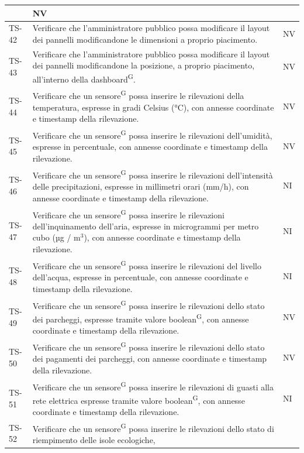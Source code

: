 \documentclass[8pt]{article}
\newcommand{\glossterm}[1]{#1\textsuperscript{G}} %
\begin{document}
\begin{longtable}{|>{\centering}p{2cm}|>{\RaggedRight}m{12cm}|>{\centering\arraybackslash}p{2cm}|}
    & NV\\
    \hline
    TS-42 & Verificare che l'amministratore pubblico possa modificare il layout dei pannelli modificandone le dimensioni a proprio piacimento.
    & NV\\
    \hline
    TS-43 & Verificare che l'amministratore pubblico possa modificare il layout dei pannelli modificandone la posizione, a proprio piacimento, all'interno della \glossterm{dashboard}.
    & NV\\
    \hline
    TS-44 & Verificare che un \glossterm{sensore} possa inserire le rilevazioni della temperatura, espresse in
    gradi Celsius (°C), con annesse coordinate e timestamp della rilevazione. & NV \\
    \hline
    TS-45 & Verificare che un \glossterm{sensore} possa inserire le rilevazioni dell'umidità, espresse in
    percentuale, con annesse coordinate e timestamp della rilevazione. & NV \\
    \hline
    TS-46 & Verificare che un \glossterm{sensore} possa inserire le rilevazioni dell'intensità delle precipitazioni, espresse in
    millimetri orari (mm/h), con annesse coordinate e timestamp della rilevazione. & NI \\
    \hline
    TS-47 & Verificare che un \glossterm{sensore} possa inserire le rilevazioni dell'inquinamento dell'aria, espresse in
    microgrammi per metro cubo (µg / $\mbox{m}^{\mbox{3}}$), con annesse coordinate e timestamp della rilevazione. & NI \\
    \hline
    TS-48 & Verificare che un \glossterm{sensore} possa inserire le rilevazioni del livello dell'acqua, espresse in
    percentuale, con annesse coordinate e timestamp della rilevazione. & NI \\
    \hline
    TS-49 & Verificare che un \glossterm{sensore} possa inserire le rilevazioni dello stato dei parcheggi,
    espresse tramite valore \glossterm{boolean}, con annesse coordinate e timestamp della rilevazione. & NV \\
    \hline 
    TS-50 & Verificare che un \glossterm{sensore} possa inserire le rilevazioni dello stato dei pagamenti
    dei parcheggi, con annesse coordinate e timestamp della rilevazione. & NV \\
    \hline
    TS-51 & Verificare che un \glossterm{sensore} possa inserire le rilevazioni di guasti alla rete elettrica espresse tramite valore \glossterm{boolean}, con annesse coordinate e timestamp della rilevazione. & NI \\
    \hline
    TS-52 & Verificare che un \glossterm{sensore} possa inserire le rilevazioni dello stato di riempimento delle isole ecologiche,

\end{longtable}
\end{document}
